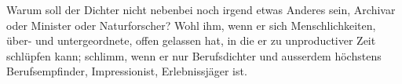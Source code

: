 Warum soll der Dichter nicht nebenbei noch irgend etwas Anderes sein, Archivar oder Minister oder Naturforscher? Wohl ihm, wenn er sich Menschlichkeiten, über- und untergeordnete, offen gelassen hat, in die er zu unproductiver Zeit schlüpfen kann; schlimm, wenn er nur Berufsdichter und ausserdem höchstens Berufsempfinder, Impressionist, Erlebnissjäger ist.
\par

